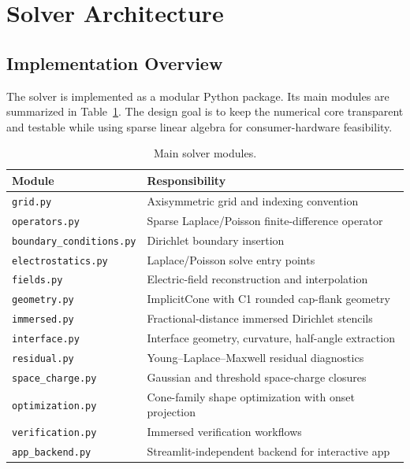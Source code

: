 \section{Solver Architecture}

\subsection{Implementation Overview}

The solver is implemented as a modular Python package. Its main modules are summarized in Table~\ref{tab:modules}. The design goal is to keep the numerical core transparent and testable while using sparse linear algebra for consumer-hardware feasibility.

\begin{table}[H]
\centering
\caption{Main solver modules.}
\label{tab:modules}
\begin{tabular}{ll}
\toprule
Module & Responsibility \\
\midrule
\texttt{grid.py} & Axisymmetric grid and indexing convention \\
\texttt{operators.py} & Sparse Laplace/Poisson finite-difference operator \\
\texttt{boundary\_conditions.py} & Dirichlet boundary insertion \\
\texttt{electrostatics.py} & Laplace/Poisson solve entry points \\
\texttt{fields.py} & Electric-field reconstruction and interpolation \\
\texttt{geometry.py} & ImplicitCone with C1 rounded cap-flank geometry \\
\texttt{immersed.py} & Fractional-distance immersed Dirichlet stencils \\
\texttt{interface.py} & Interface geometry, curvature, half-angle extraction \\
\texttt{residual.py} & Young--Laplace--Maxwell residual diagnostics \\
\texttt{space\_charge.py} & Gaussian and threshold space-charge closures \\
\texttt{optimization.py} & Cone-family shape optimization with onset projection \\
\texttt{verification.py} & Immersed verification workflows \\
\texttt{app\_backend.py} & Streamlit-independent backend for interactive app \\
\bottomrule
\end{tabular}
\end{table}

